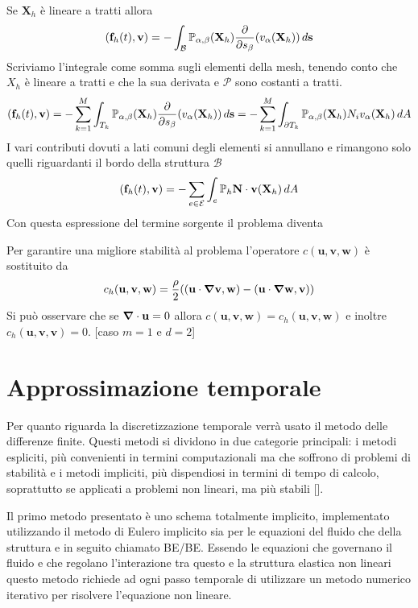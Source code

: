 Se $\mathbf{X}_h$ è lineare a tratti allora 
$$\ps{\mathbf{f}_h(t)}{\mathbf{v}}=-\int_{\mathcal{B}}\mathbb{P}_{\alpha,\beta}(\mathbf{X}_h)\frac{\partial}{\partial s_\beta}(v_\alpha(\mathbf{X}_h))\, d\mathbf{s}$$
Scriviamo l'integrale come somma sugli elementi della mesh, tenendo conto che $X_h$ è lineare a tratti e che la sua derivata e $\mathcal{P}$ sono costanti a tratti.
$$\ps{\mathbf{f}_h(t)}{\mathbf{v}}=-\sum^M_{k=1}\int_{T_k}\mathbb{P}_{\alpha,\beta}(\mathbf{X}_h)\frac{\partial}{\partial s_\beta}(v_\alpha(\mathbf{X}_h))\, d\mathbf{s}
    =-\sum^M_{k=1}\int_{\partial T_k}\mathbb{P}_{\alpha,\beta}(\mathbf{X}_h)N_i v_\alpha(\mathbf{X}_h)\, dA$$
I vari contributi dovuti a lati comuni degli elementi si annullano e rimangono solo quelli riguardanti il bordo della struttura $\mathcal{B}$
$$\ps{\mathbf{f}_h(t)}{\mathbf{v}}=-\sum_{e\in\mathcal{E}}\int_e\mathbb{P}_h\mathbf{N}\cdot\mathbf{v}(\mathbf{X}_h)\,dA$$
Con questa espressione del termine sorgente il problema diventa
\begin{problem}
\end{problem}
Per garantire una migliore stabilità al problema l'operatore $c(\mathbf{u},\mathbf{v},\mathbf{w})$ è sostituito da
$$c_h(\mathbf{u},\mathbf{v},\mathbf{w})=\frac{\rho}{2}(\ps{\mathbf{u}\cdot\Nabla\mathbf{v}}{\mathbf{w}}-\ps{\mathbf{u}\cdot\Nabla\mathbf{w}}{\mathbf{v}})$$
Si può osservare che se $\boldsymbol{\nabla}\cdot\mathbf{u}=0$ allora $c(\mathbf{u},\mathbf{v},\mathbf{w})=c_h(\mathbf{u},\mathbf{v},\mathbf{w})$ e inoltre $c_h(\mathbf{u},\mathbf{v},\mathbf{v})=0$.
[caso $m=1$ e $d=2$]

\section{Approssimazione temporale}

Per quanto riguarda la discretizzazione temporale verrà usato il metodo delle differenze finite. Questi metodi si dividono in due categorie principali: i metodi espliciti, più convenienti in termini computazionali ma che soffrono di problemi di stabilità e i metodi impliciti, più dispendiosi in termini di tempo di calcolo, soprattutto se applicati a problemi non lineari, ma più stabili [].

Il primo metodo presentato è uno schema totalmente implicito, implementato utilizzando il metodo di Eulero implicito sia per le equazioni del fluido che della struttura e in seguito chiamato BE/BE. Essendo le equazioni che governano il fluido e che regolano l'interazione tra questo e la struttura elastica non lineari questo metodo richiede ad ogni passo temporale di utilizzare un metodo numerico iterativo per risolvere l'equazione non lineare.

